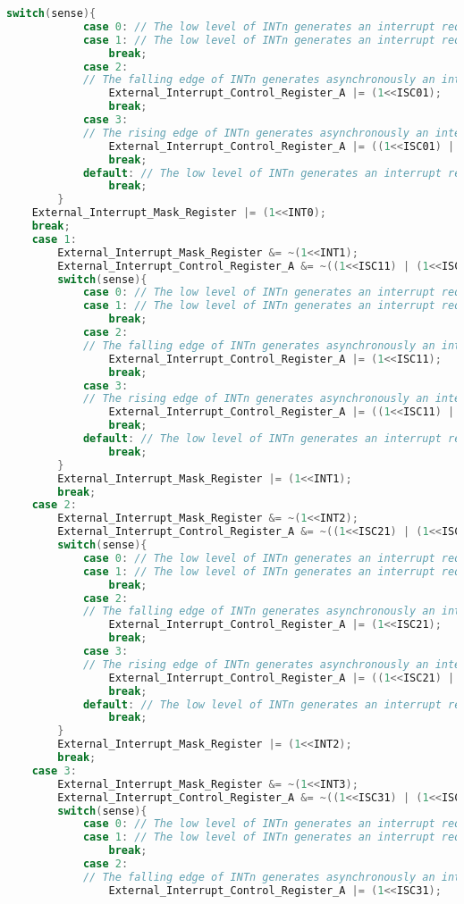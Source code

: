 \begin{lstlisting}[language=C]
		switch(sense){
			case 0: // The low level of INTn generates an interrupt request.
			case 1: // The low level of INTn generates an interrupt request.
				break;
			case 2: 
			// The falling edge of INTn generates asynchronously an interrupt request.
				External_Interrupt_Control_Register_A |= (1<<ISC01);
				break;
			case 3: 
			// The rising edge of INTn generates asynchronously an interrupt request.
				External_Interrupt_Control_Register_A |= ((1<<ISC01) | (1<<ISC00));
				break;
			default: // The low level of INTn generates an interrupt request.
				break;
		}
	External_Interrupt_Mask_Register |= (1<<INT0);
	break;
	case 1:
		External_Interrupt_Mask_Register &= ~(1<<INT1);
		External_Interrupt_Control_Register_A &= ~((1<<ISC11) | (1<<ISC10));
		switch(sense){
			case 0: // The low level of INTn generates an interrupt request.
			case 1: // The low level of INTn generates an interrupt request.
				break;
			case 2: 
			// The falling edge of INTn generates asynchronously an interrupt request.
				External_Interrupt_Control_Register_A |= (1<<ISC11);
				break;
			case 3: 
			// The rising edge of INTn generates asynchronously an interrupt request.
				External_Interrupt_Control_Register_A |= ((1<<ISC11) | (1<<ISC10));
				break;
			default: // The low level of INTn generates an interrupt request.
				break;
		}
		External_Interrupt_Mask_Register |= (1<<INT1);
		break;
	case 2:
		External_Interrupt_Mask_Register &= ~(1<<INT2);
		External_Interrupt_Control_Register_A &= ~((1<<ISC21) | (1<<ISC20));
		switch(sense){
			case 0: // The low level of INTn generates an interrupt request.
			case 1: // The low level of INTn generates an interrupt request.
				break;
			case 2: 
			// The falling edge of INTn generates asynchronously an interrupt request.
				External_Interrupt_Control_Register_A |= (1<<ISC21);
				break;
			case 3: 
			// The rising edge of INTn generates asynchronously an interrupt request.
				External_Interrupt_Control_Register_A |= ((1<<ISC21) | (1<<ISC20));
				break;
			default: // The low level of INTn generates an interrupt request.
				break;
		}
		External_Interrupt_Mask_Register |= (1<<INT2);
		break;
	case 3:
		External_Interrupt_Mask_Register &= ~(1<<INT3);
		External_Interrupt_Control_Register_A &= ~((1<<ISC31) | (1<<ISC30));
		switch(sense){
			case 0: // The low level of INTn generates an interrupt request.
			case 1: // The low level of INTn generates an interrupt request.
				break;
			case 2: 
			// The falling edge of INTn generates asynchronously an interrupt request.
				External_Interrupt_Control_Register_A |= (1<<ISC31);

\end{lstlisting}
